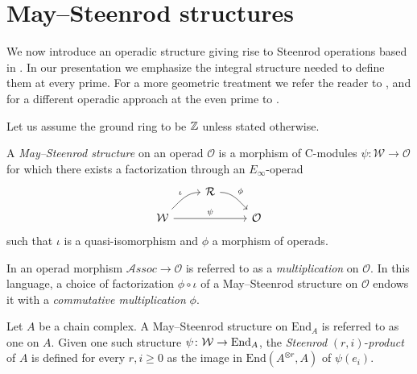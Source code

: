 
\section{May--Steenrod structures} \label{s:steenrod}

We now introduce an operadic structure giving rise to Steenrod operations based in \cite{may1970general}.
In our presentation we emphasize the integral structure needed to define them at every prime.
For a more geometric treatment we refer the reader to \cite{may1972geometry, may76homology, lawson2020dyerlashof}, and for a different operadic approach at the even prime to \cite{chataur2005adem-cartan}.

Let us assume the ground ring to be $\mathbb{Z}$ unless stated otherwise.
\begin{definition} \label{def: May--Steenrod structure}
	A \textit{May--Steenrod structure} on an operad $\mathcal O$ is a
	morphism of $\mathrm{C}$-modules $\psi \colon \mathcal W \to \mathcal O$ for which there exists a factorization through an $E_\infty$-operad
	\begin{equation*}
	\begin{tikzcd}[column sep = normal, row sep = small]
	& \mathcal R \arrow[dr, "\phi", out=0] & \\
	\mathcal W \arrow[ur, "\iota", in=180] \arrow[rr, "\psi"] & & \mathcal O
	\end{tikzcd}
	\end{equation*}
	such that $\iota$ is a quasi-isomorphism and $\phi$ a morphism of operads.
\end{definition}

\begin{remark} \label{rmk: Deligne conjecture}
	In \cite{GerstenhaberVoronov} an operad morphism $\mathcal{A}ssoc \to \mathcal O$ is referred to as a \textit{multiplication} on $\mathcal O$.
	In this language, a choice of factorization $\phi \circ \iota$ of a May--Steenrod structure on $\mathcal O$ endows it with a \textit{commutative multiplication} $\phi$.
\end{remark}

\begin{definition} \label{def: Steenrod products}
	Let $A$ be a chain complex.
	A May--Steenrod structure on $\mathrm{End}_A$ is referred to as one on $A$.
	Given one such structure $\psi \colon \mathcal W \to \mathrm{End}_A$, the \textit{Steenrod} $(r, i)$-\textit{product} of $A$ is defined for every $r, i \geq 0$ as the image in $ \mathrm{End}(A^{\otimes r}, A)$ of $\psi(e_i)$.
\end{definition}

